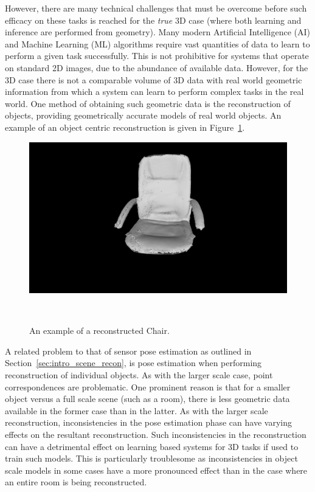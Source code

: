 However, there are many technical challenges that must be overcome before such efficacy on these tasks is reached 
for the \textit{true} 3D case (where both learning and inference are performed from geometry). Many modern Artificial 
Intelligence (AI) and Machine Learning (ML) algorithms require vast quantities of data to learn to perform a given task 
successfully. This is not prohibitive for systems that operate on standard 2D images, due to the abundance of available 
data. However, for the 3D case there is not a comparable volume of 3D data with real world geometric information from which 
a system can learn to perform complex tasks in the real world. One method of obtaining such geometric data is the reconstruction 
of objects, providing geometrically accurate models of real world objects. An example of an object centric reconstruction 
is given in Figure~\ref{figure:intro_object_teaser}.
\begin{figure}[!htbp]
  \centering
  \includegraphics[width=.8\linewidth]{figures/intro/chair.png}
  \caption[Object Scale Dense Reconstruction]{An example of a reconstructed Chair.}
~\label{figure:intro_object_teaser}
\end{figure}

A related problem to that of sensor pose estimation as outlined in Section~\ref{sec:intro_scene_recon}, 
is pose estimation when performing reconstruction of individual objects. As with the larger scale case, point 
correspondences are problematic. One prominent reason is that for a smaller object versus a full scale scene 
(such as a room), there is less geometric data available in the former case than in the latter. As with the larger 
scale reconstruction, inconsistencies in the pose estimation phase can have varying effects on the resultant 
reconstruction. Such inconsistencies in the reconstruction can have a detrimental effect on learning based systems 
for 3D tasks if used to train such models. This is particularly troublesome as inconsistencies in object scale models 
in some cases have a more pronounced effect than in the case where an entire room is being reconstructed.

